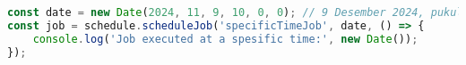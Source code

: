 \begin{lstlisting}[language=Javascript,caption={Penjadwalan dengan Waktu Spesifik}]
const date = new Date(2024, 11, 9, 10, 0, 0); // 9 Desember 2024, pukul 10:00:00
const job = schedule.scheduleJob('specificTimeJob', date, () => {
    console.log('Job executed at a spesific time:', new Date());
});
\end{lstlisting}